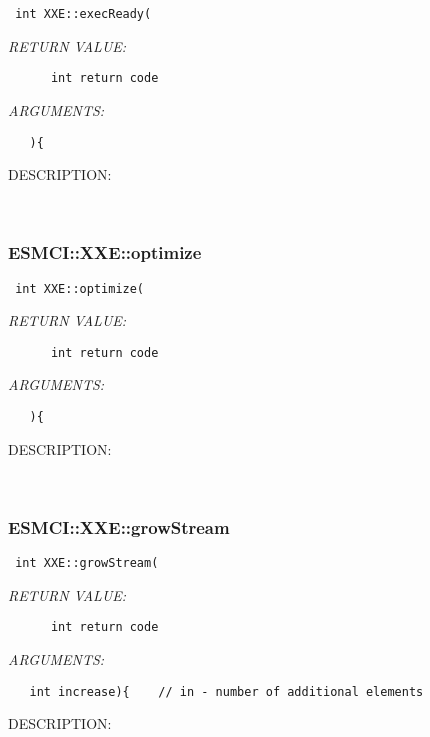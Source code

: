   
\begin{verbatim} int XXE::execReady(\end{verbatim}{\em RETURN VALUE:}
\begin{verbatim}      int return code\end{verbatim}{\em ARGUMENTS:}
\begin{verbatim}   ){\end{verbatim}
{\sf DESCRIPTION:\\ }


   
 
\mbox{}\hrulefill\
 
\subsubsection [ESMCI::XXE::optimize] {ESMCI::XXE::optimize}


  
\begin{verbatim} int XXE::optimize(\end{verbatim}{\em RETURN VALUE:}
\begin{verbatim}      int return code\end{verbatim}{\em ARGUMENTS:}
\begin{verbatim}   ){\end{verbatim}
{\sf DESCRIPTION:\\ }


   
 
\mbox{}\hrulefill\
 
\subsubsection [ESMCI::XXE::growStream] {ESMCI::XXE::growStream}


  
\begin{verbatim} int XXE::growStream(\end{verbatim}{\em RETURN VALUE:}
\begin{verbatim}      int return code\end{verbatim}{\em ARGUMENTS:}
\begin{verbatim}   int increase){    // in - number of additional elements\end{verbatim}
{\sf DESCRIPTION:\\ }



